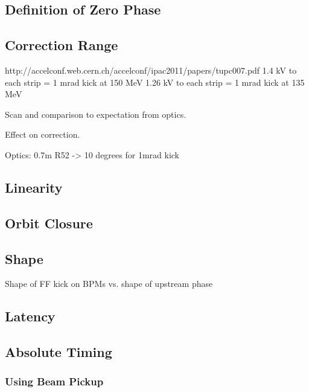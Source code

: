 \subsection{Definition of Zero Phase}
\label{ss:zeroPhase}


\subsection{Correction Range}
\label{ss:corrRange}

http://accelconf.web.cern.ch/accelconf/ipac2011/papers/tupc007.pdf
1.4 kV to each strip = 1 mrad kick at 150 MeV
1.26 kV to each strip = 1 mrad kick at 135 MeV


Scan and comparison to expectation from optics.

Effect on correction.

Optics: 0.7m R52 -> 10 degrees for 1mrad kick


\subsection{Linearity}
\label{ss:kickLin}

\subsection{Orbit Closure}
\label{ss:orbitClosure}

\subsection{Shape}
\label{ss:kickShape}

Shape of FF kick on BPMs vs. shape of upstream phase


\subsection{Latency}
\label{ss:measLatency}

\subsection{Absolute Timing}
\label{ss:absTiming}

\subsubsection{Using Beam Pickup}
\label{sss:beamPickup}

